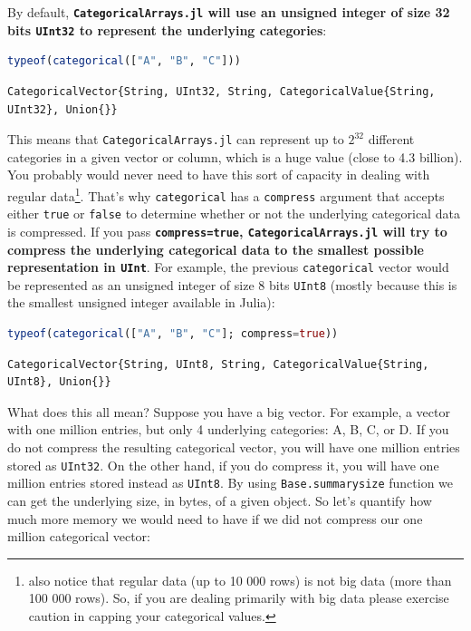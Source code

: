 \documentclass[
  notoc %
]{tufte-book}
\newcommand{\passthrough}[1]{#1}
\begin{document}
By default, \textbf{\passthrough{\lstinline!CategoricalArrays.jl!} will
use an unsigned integer of size 32 bits \passthrough{\lstinline!UInt32!}
to represent the underlying categories}:

\begin{lstlisting}[language=Julia]
typeof(categorical(["A", "B", "C"]))
\end{lstlisting}

\begin{lstlisting}
CategoricalVector{String, UInt32, String, CategoricalValue{String, UInt32}, Union{}}
\end{lstlisting}

This means that \passthrough{\lstinline!CategoricalArrays.jl!} can
represent up to \(2^{32}\) different categories in a given vector or
column, which is a huge value (close to 4.3 billion). You probably would
never need to have this sort of capacity in dealing with regular
data\footnote{also notice that regular data (up to 10 000 rows) is not
  big data (more than 100 000 rows). So, if you are dealing primarily
  with big data please exercise caution in capping your categorical
  values.}. That's why \passthrough{\lstinline!categorical!} has a
\passthrough{\lstinline!compress!} argument that accepts either
\passthrough{\lstinline!true!} or \passthrough{\lstinline!false!} to
determine whether or not the underlying categorical data is compressed.
If you pass \textbf{\passthrough{\lstinline!compress=true!},
\passthrough{\lstinline!CategoricalArrays.jl!} will try to compress the
underlying categorical data to the smallest possible representation in
\passthrough{\lstinline!UInt!}}. For example, the previous
\passthrough{\lstinline!categorical!} vector would be represented as an
unsigned integer of size 8 bits \passthrough{\lstinline!UInt8!} (mostly
because this is the smallest unsigned integer available in Julia):

\begin{lstlisting}[language=Julia]
typeof(categorical(["A", "B", "C"]; compress=true))
\end{lstlisting}

\begin{lstlisting}
CategoricalVector{String, UInt8, String, CategoricalValue{String, UInt8}, Union{}}
\end{lstlisting}

What does this all mean? Suppose you have a big vector. For example, a
vector with one million entries, but only 4 underlying categories: A, B,
C, or D. If you do not compress the resulting categorical vector, you
will have one million entries stored as
\passthrough{\lstinline!UInt32!}. On the other hand, if you do compress
it, you will have one million entries stored instead as
\passthrough{\lstinline!UInt8!}. By using
\passthrough{\lstinline!Base.summarysize!} function we can get the
underlying size, in bytes, of a given object. So let's quantify how much
more memory we would need to have if we did not compress our one million
categorical vector:
\end{document}
